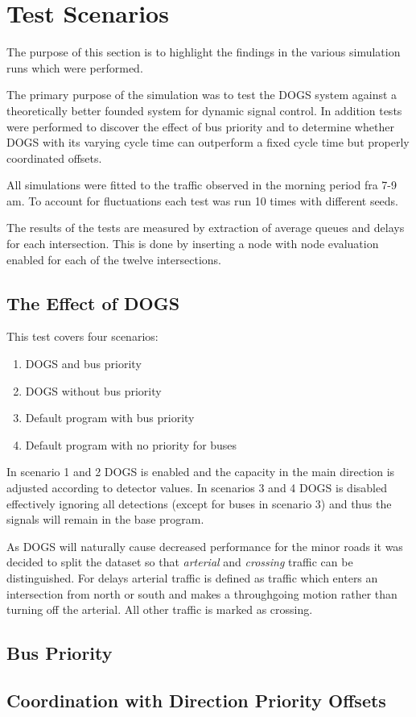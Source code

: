 \section{Test Scenarios}
The purpose of this section is to highlight the findings in the various simulation runs which were performed.

The primary purpose of the simulation was to test the DOGS system against a theoretically better founded system for dynamic signal control. In addition tests were performed to discover the effect of bus priority and to determine whether DOGS with its varying cycle time can outperform a fixed cycle time but properly coordinated offsets.

All simulations were fitted to the traffic observed in the morning period fra 7-9 am.
To account for fluctuations each test was run 10 times with different seeds.

The results of the tests are measured by extraction of average queues and delays for each intersection. This is done by inserting a node with node evaluation enabled for each of the twelve intersections.

\subsection{The Effect of DOGS}
This test covers four scenarios:

\begin{enumerate}
\item DOGS and bus priority
\item DOGS without bus priority
\item Default program with bus priority
\item Default program with no priority for buses
\end{enumerate}

In scenario 1 and 2 DOGS is enabled and the capacity in the main direction is adjusted according to detector values. In scenarios 3 and 4 DOGS is disabled effectively ignoring all detections (except for buses in scenario 3) and thus the signals will remain in the base program.

As DOGS will naturally cause decreased performance for the minor roads it was decided to split the dataset so that \textit{arterial} and \textit{crossing} traffic can be distinguished. For delays arterial traffic is defined as traffic which enters an intersection from north or south and makes a throughgoing motion rather than turning off the arterial. All other traffic is marked as crossing.

\subsection*{Bus Priority}


\subsection{Coordination with Direction Priority Offsets}

